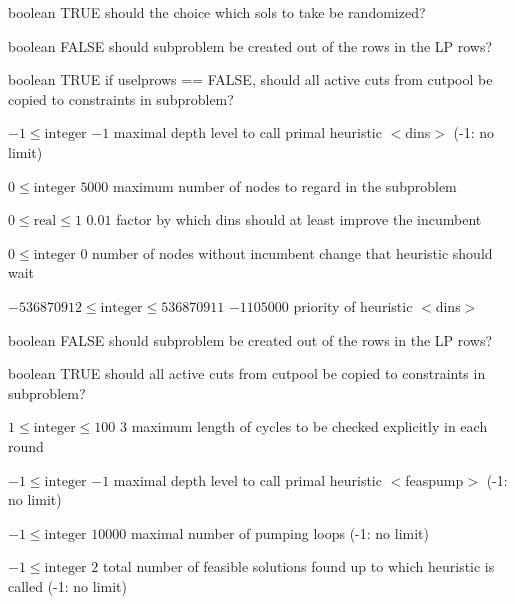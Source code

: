%
{boolean}%
{TRUE}%
{should the choice which sols to take be randomized?}%
{}

%
{boolean}%
{FALSE}%
{should subproblem be created out of the rows in the LP rows?}%
{}

%
{boolean}%
{TRUE}%
{if uselprows == FALSE, should all active cuts from cutpool be copied to constraints in subproblem?}%
{}

%
{$-1\leq\textrm{integer}$}%
{$-1$}%
{maximal depth level to call primal heuristic $<$dins$>$ (-1: no limit)}%
{}

%
{$0\leq\textrm{integer}$}%
{$5000$}%
{maximum number of nodes to regard in the subproblem}%
{}

%
{$0\leq\textrm{real}\leq1$}%
{$0.01$}%
{factor by which dins should at least improve the incumbent  }%
{}

%
{$0\leq\textrm{integer}$}%
{$0$}%
{number of nodes without incumbent change that heuristic should wait}%
{}

%
{$-536870912\leq\textrm{integer}\leq536870911$}%
{$-1105000$}%
{priority of heuristic $<$dins$>$}%
{}

%
{boolean}%
{FALSE}%
{should subproblem be created out of the rows in the LP rows?}%
{}

%
{boolean}%
{TRUE}%
{should all active cuts from cutpool be copied to constraints in subproblem?}%
{}

%
{$1\leq\textrm{integer}\leq100$}%
{$3$}%
{maximum length of cycles to be checked explicitly in each round}%
{}

%
{$-1\leq\textrm{integer}$}%
{$-1$}%
{maximal depth level to call primal heuristic $<$feaspump$>$ (-1: no limit)}%
{}

%
{$-1\leq\textrm{integer}$}%
{$10000$}%
{maximal number of pumping loops (-1: no limit)}%
{}

%
{$-1\leq\textrm{integer}$}%
{$2$}%
{total number of feasible solutions found up to which heuristic is called (-1: no limit)}%
{}

